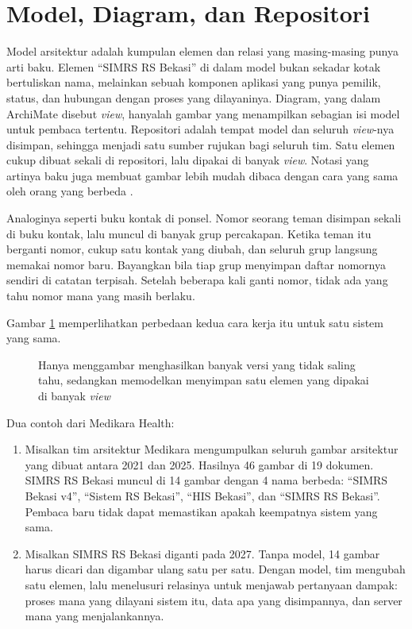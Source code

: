 \section{Model, Diagram, dan Repositori}

Model arsitektur adalah kumpulan elemen dan relasi yang masing-masing punya
arti baku. Elemen ``SIMRS RS Bekasi'' di dalam model bukan sekadar kotak
bertuliskan nama, melainkan sebuah komponen aplikasi yang punya pemilik,
status, dan hubungan dengan proses yang dilayaninya. Diagram, yang dalam
ArchiMate disebut \textit{view}, hanyalah gambar yang menampilkan sebagian
isi model untuk pembaca tertentu. Repositori adalah tempat model dan seluruh
\textit{view}-nya disimpan, sehingga menjadi satu sumber rujukan bagi
seluruh tim. Satu elemen cukup dibuat sekali di repositori, lalu dipakai di
banyak \textit{view}. Notasi yang artinya baku juga membuat gambar lebih
mudah dibaca dengan cara yang sama oleh orang yang berbeda \cite{c04-moody2009}.

Analoginya seperti buku kontak di ponsel. Nomor seorang teman disimpan sekali
di buku kontak, lalu muncul di banyak grup percakapan. Ketika teman itu
berganti nomor, cukup satu kontak yang diubah, dan seluruh grup langsung
memakai nomor baru. Bayangkan bila tiap grup menyimpan daftar nomornya
sendiri di catatan terpisah. Setelah beberapa kali ganti nomor, tidak ada yang
tahu nomor mana yang masih berlaku.

Gambar \ref{fig:ch04-model-view} memperlihatkan perbedaan kedua cara kerja
itu untuk satu sistem yang sama.

\begin{figure}[!htb]
  \centering
  
  \caption{Hanya menggambar menghasilkan banyak versi yang tidak saling tahu,
           sedangkan memodelkan menyimpan satu elemen yang dipakai di banyak
           \textit{view}}
  \label{fig:ch04-model-view}
\end{figure}

Dua contoh dari Medikara Health:

\begin{enumerate}
  \item Misalkan tim arsitektur Medikara mengumpulkan seluruh gambar
        arsitektur yang dibuat antara 2021 dan 2025. Hasilnya 46 gambar di 19
        dokumen. SIMRS RS Bekasi muncul di 14 gambar dengan 4 nama berbeda:
        ``SIMRS Bekasi v4'', ``Sistem RS Bekasi'', ``HIS Bekasi'', dan
        ``SIMRS RS Bekasi''. Pembaca baru tidak dapat memastikan apakah
        keempatnya sistem yang sama.
  \item Misalkan SIMRS RS Bekasi diganti pada 2027. Tanpa model, 14 gambar
        harus dicari dan digambar ulang satu per satu. Dengan model, tim
        mengubah satu elemen, lalu menelusuri relasinya untuk menjawab
        pertanyaan dampak: proses mana yang dilayani sistem itu, data apa yang
        disimpannya, dan server mana yang menjalankannya.
\end{enumerate}

